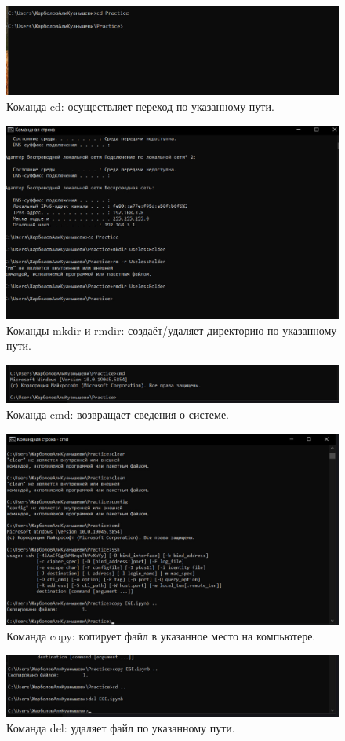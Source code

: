 \begin{figure}[h!]
    \centering
    \includegraphics[width=0.5\linewidth]{Pic/lab1/photo_2025-05-21_08-15-34.jpg}
    \caption{Команда cd: осуществляет переход по указанному пути.}
    \label{fig:enter-label}
\end{figure}

\begin{figure}[h!]
    \centering
    \includegraphics[width=0.5\linewidth]{Pic/lab1/photo_2025-05-21_08-15-36.jpg}
    \caption{Команды mkdir и rmdir: создаёт/удаляет директорию по указанному пути.}
    \label{fig:enter-label}
\end{figure}

\begin{figure}[h!]
    \centering
    \includegraphics[width=0.5\linewidth]{Pic/lab1/photo_2025-05-21_08-15-38.jpg}
    \caption{Команда cmd: возвращает сведения о системе.}
    \label{fig:enter-label}
\end{figure}

\begin{figure}[h!]
    \centering
    \includegraphics[width=0.4\linewidth]{Pic/lab1/photo_2025-05-21_08-15-40.jpg}
    \caption{Команда copy: копирует файл в указанное место на компьютере.}
    \label{fig:enter-label}
\end{figure}

\begin{figure}[h!]
    \centering
    \includegraphics[width=0.5\linewidth]{Pic/lab1/photo_2025-05-21_08-15-41.jpg}
    \caption{Команда del: удаляет файл по указанному пути.}
    \label{fig:enter-label}
\end{figure}

